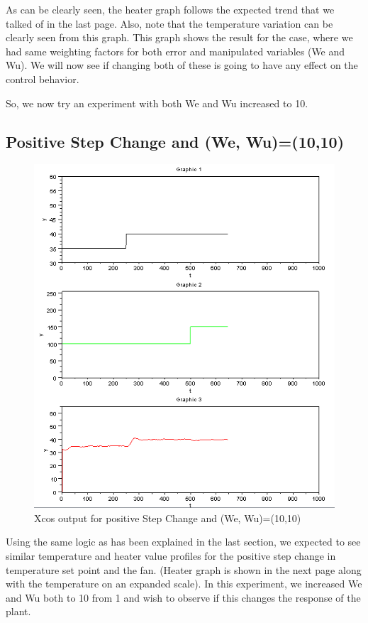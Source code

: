 As can be clearly seen, the heater graph follows the expected trend that we talked of in the last page. Also, note that the temperature variation can be clearly seen from this graph.
This graph shows the result for the case, where we had same weighting factors for both error and manipulated variables (We and Wu). We will now see if changing both of these is going to have any effect on the control behavior. 

So, we now try an experiment with both We and Wu increased to 10.


\subsection{Positive Step Change and (We, Wu)=(10,10)}
\begin{figure}[H]
\centering
  \includegraphics[width=0.8\linewidth]{mpc/1_2.png}
  \caption{Xcos output for positive Step Change and (We, Wu)=(10,10)}
\end{figure}
Using the same logic as has been explained in the last section, we expected to see similar temperature and heater value profiles for the positive step change in temperature set point and the fan. (Heater graph is shown in the next page along with the temperature on an expanded scale).  In this experiment, we increased We and Wu both to 10 from 1 and wish to observe if this changes the response of the plant.
